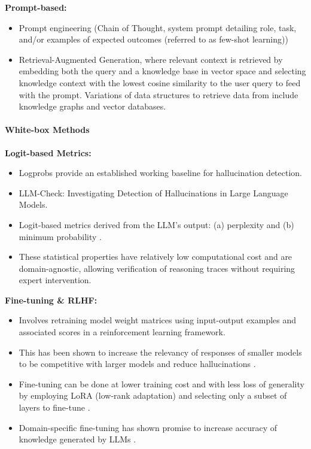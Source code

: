 \documentclass[12pt]{article}
\begin{document}
\textbf{Prompt-based:}
\begin{itemize}
    \item Prompt engineering (Chain of Thought, system prompt detailing role, task, and/or examples of expected outcomes (referred to as few-shot learning))
    \item Retrieval-Augmented Generation, where relevant context is retrieved by embedding both the query and a knowledge base in vector space and selecting knowledge context with the lowest cosine similarity to the user query to feed with the prompt. Variations of data structures to retrieve data from include knowledge graphs and vector databases.
\end{itemize}

\paragraph{White-box Methods}

\textbf{Logit-based Metrics:}
\begin{itemize}
    \item Logprobs provide an established working baseline for hallucination detection.
    \item LLM-Check: Investigating Detection of Hallucinations in Large Language Models.
    \item Logit-based metrics derived from the LLM's output: (a) perplexity and (b) minimum probability \cite{varshney2023stitch}.
    \item These statistical properties have relatively low computational cost and are domain-agnostic, allowing verification of reasoning traces without requiring expert intervention.
\end{itemize}

\textbf{Fine-tuning \& RLHF:}
\begin{itemize}
    \item Involves retraining model weight matrices using input-output examples and associated scores in a reinforcement learning framework.
    \item This has been shown to increase the relevancy of responses of smaller models to be competitive with larger models and reduce hallucinations \cite{ouyang2022rlhf}.
    \item Fine-tuning can be done at lower training cost and with less loss of generality by employing LoRA (low-rank adaptation) and selecting only a subset of layers to fine-tune \cite{hu2021lora}.
    \item Domain-specific fine-tuning has shown promise to increase accuracy of knowledge generated by LLMs \cite{Susnjak2024}.
\end{itemize}
\end{document}
